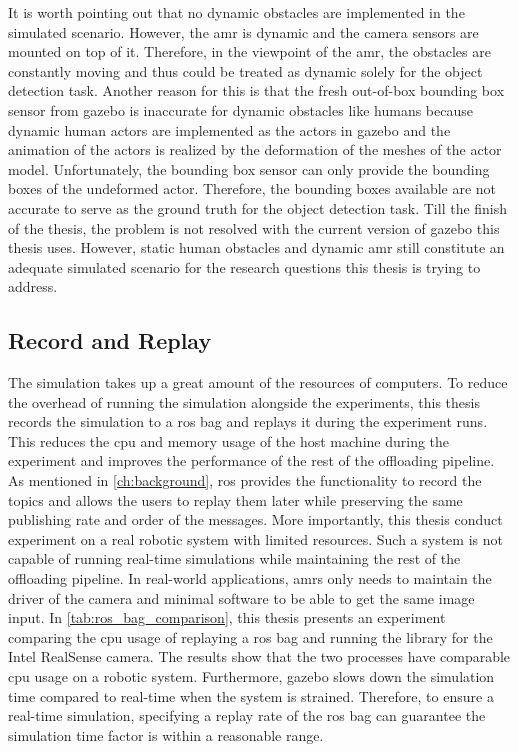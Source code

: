 It is worth pointing out that no dynamic obstacles are implemented in the simulated scenario. However, the \gls{amr} is dynamic and the camera sensors are mounted on top of it. Therefore, in the viewpoint of the \gls{amr}, the obstacles are constantly moving and thus could be treated as dynamic solely for the object detection task. Another reason for this is that the fresh out-of-box bounding box sensor from \gls{gazebo} is inaccurate for dynamic obstacles like humans because dynamic human actors are implemented as the actors in \gls{gazebo} and the animation of the actors is realized by the deformation of the meshes of the actor model. Unfortunately, the bounding box sensor can only provide the bounding boxes of the undeformed actor. Therefore, the bounding boxes available are not accurate to serve as the ground truth for the object detection task. Till the finish of the thesis, the problem is not resolved with the current version of \gls{gazebo} this thesis uses. However, static human obstacles and dynamic \gls{amr} still constitute an adequate simulated scenario for the research questions this thesis is trying to address. 

\subsection{Record and Replay}

The simulation takes up a great amount of the resources of computers. To reduce the overhead of running the simulation alongside the experiments, this thesis records the simulation to a \gls{ros} bag and replays it during the experiment runs. This reduces the \gls{cpu} and memory usage of the host machine during the experiment and improves the performance of the rest of the offloading pipeline. As mentioned in \cref{ch:background}, \gls{ros} provides the functionality to record the topics and allows the users to replay them later while preserving the same publishing rate and order of the messages. More importantly, this thesis conduct experiment on a real robotic system with limited resources. Such a system is not capable of running real-time simulations while maintaining the rest of the offloading pipeline. In real-world applications, \glspl{amr} only needs to maintain the driver of the camera and minimal software to be able to get the same image input. In \cref{tab:ros_bag_comparison}, this thesis presents an experiment comparing the \gls{cpu} usage of replaying a \gls{ros} bag and running the library for the Intel RealSense camera. The results show that the two processes have comparable \gls{cpu} usage on a robotic system. Furthermore, \gls{gazebo} slows down the simulation time compared to real-time when the system is strained. Therefore, to ensure a real-time simulation, specifying a replay rate of the \gls{ros} bag can guarantee the simulation time factor is within a reasonable range. 

